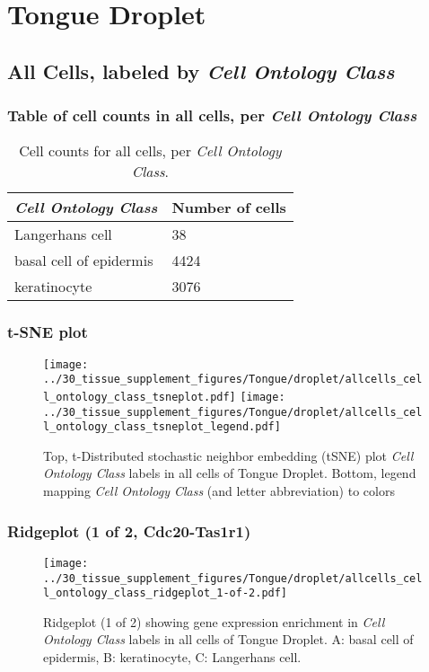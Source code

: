 \clearpage
\section{Tongue Droplet}

\subsection{All Cells, labeled by \emph{Cell Ontology Class}}
\subsubsection{Table of cell counts in all cells, per \emph{Cell Ontology Class}}\begin{table}[h]
\centering
\label{my-label}
\begin{tabular}{@{}ll@{}}
\toprule

\emph{Cell Ontology Class}& Number of cells \\ \midrule
Langerhans cell & 38 \\

basal cell of epidermis & 4424 \\

keratinocyte & 3076 \\
\bottomrule
\end{tabular}
\caption{Cell counts for all cells, per \emph{Cell Ontology Class}.}
\end{table}

\clearpage
\subsubsection{t-SNE plot}
\begin{figure}[h]
\centering
\texttt{[image: ../30\_tissue\_supplement\_figures/Tongue/droplet/allcells\_cell\_ontology\_class\_tsneplot.pdf]}
\texttt{[image: ../30\_tissue\_supplement\_figures/Tongue/droplet/allcells\_cell\_ontology\_class\_tsneplot\_legend.pdf]}
\caption{Top, t-Distributed stochastic neighbor embedding (tSNE) plot  \emph{Cell Ontology Class} labels in all cells of Tongue Droplet. Bottom, legend mapping \emph{Cell Ontology Class} (and letter abbreviation) to colors}
\end{figure}


\clearpage

\subsubsection{Ridgeplot (1 of 2, Cdc20-Tas1r1)}
\begin{figure}[h]
\centering
\texttt{[image: ../30\_tissue\_supplement\_figures/Tongue/droplet/allcells\_cell\_ontology\_class\_ridgeplot\_1-of-2.pdf]}

\caption{ Ridgeplot (1 of 2)  showing gene expression enrichment in \emph{Cell Ontology Class} labels in all cells of Tongue Droplet. A: basal cell of epidermis, B: keratinocyte, C: Langerhans cell.}
\end{figure}


